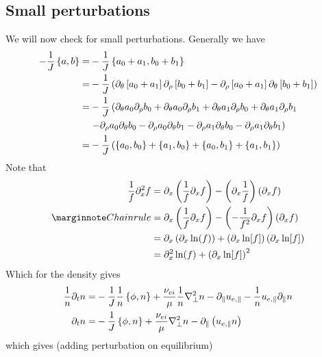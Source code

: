 \subsection{Small perturbations}
We will now check for small perturbations.
Generally we have
\begin{align*}
    -\frac{1}{J}\left\{a,b\right\}
 =&
 -\frac{1}{J}\left\{a_0+a_1,b_0+b_1\right\}
\\
 =&
 -\frac{1}{J} \left( \partial_\theta \left[ a_0 + a_1 \right]
                  \partial_\rho   \left[ b_0 + b_1 \right]
                - \partial_\rho   \left[ a_0 + a_1 \right]
                  \partial_\theta \left[ b_0 +b_1 \right]
                \right)
\\
 =&
 -\frac{1}{J} \left(
   \partial_\theta a_0 \partial_\rho b_0
 + \partial_\theta a_0 \partial_\rho b_1
 + \partial_\theta a_1 \partial_\rho b_0
 + \partial_\theta a_1 \partial_\rho b_1
 \right.
 \\&
 \left.
 - \partial_\rho a_0 \partial_\theta b_0
 - \partial_\rho a_0 \partial_\theta b_1
 - \partial_\rho a_1 \partial_\theta b_0
 - \partial_\rho a_1 \partial_\theta b_1
                \right)
\\
 =&
 -\frac{1}{J} \left(
   \left\{a_0,b_0\right\}
 + \left\{a_1,b_0\right\}
 + \left\{a_0,b_1\right\}
 + \left\{a_1,b_1\right\}
                \right)
\end{align*}
Note that
\begin{align*}
    \frac{1}{f}\partial_x^2 f
    &=
    \partial_x\L(\frac{1}{f}\partial_x f\R)
    - \L(\partial_x\frac{1}{f}\R)\L(\partial_x f\R)
    \\
    \note{Chain rule}
    &=
    \partial_x\L(\frac{1}{f}\partial_x f\R)
    - \L(-\frac{1}{f^2}\partial_x f\R)\L(\partial_x f\R)
    \\
    &=
    \partial_x\L(\partial_x \ln(f)\R)
    + \L(\partial_x \ln[f]\R)\L(\partial_x \ln[f]\R)
    \\
    &=
    \partial_x^2 \ln(f)
    + \L(\partial_x \ln[f]\R)^2
\end{align*}
Which for the density gives
\begin{align*}
 \frac{1}{n}\partial_t n
 =&
 -\frac{1}{J}\frac{1}{n}\L\{\phi,n\R\}
 +\frac{\nu_{ei}}{\mu} \frac{1}{n}\grad_\perp^2 n
- \partial_\|u_{e,\|}
- \frac{1}{n}u_{e,\|} \partial_\| n
\\
%
 \partial_t n
 =&
 -\frac{1}{J}\L\{\phi,n\R\}
 +\frac{\nu_{ei}}{\mu} \grad_\perp^2 n
-  \partial_\| \L(u_{e,\|}n\R)
\end{align*}
which gives (adding perturbation on equilibrium)
